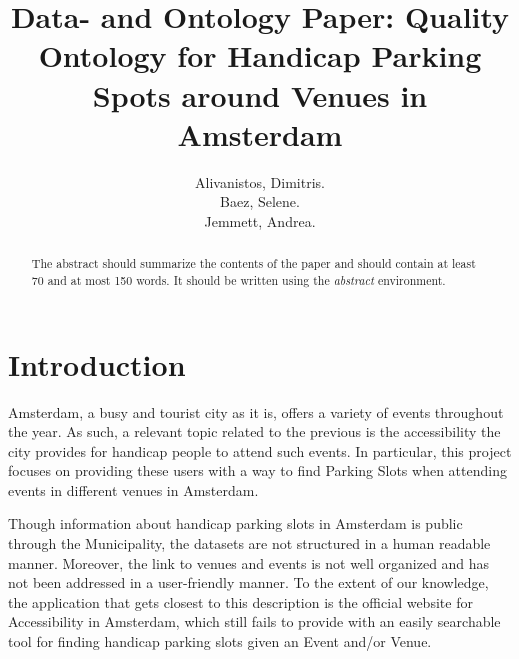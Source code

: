 \documentclass[runningheads,a4paper]{../../StyleFiles/llncs}
\begin{document}
\mainmatter  %

\title{Data- and Ontology Paper: Quality Ontology for Handicap Parking Spots around Venues in Amsterdam}


%
%
\author{Alivanistos, Dimitris. \\ Baez, Selene. \\ Jemmett, Andrea. }
%


\maketitle


\begin{abstract}
The abstract should summarize the contents of the paper and should
contain at least 70 and at most 150 words. It should be written using the
\emph{abstract} environment.
\end{abstract}


\section{Introduction}
Amsterdam, a busy and tourist city as it is, offers a variety of events throughout the year. As such, a relevant topic related to the previous is the accessibility the city provides for handicap people to attend such events. In particular, this project focuses on providing these users with a way to find Parking Slots when attending events in different venues in Amsterdam.

Though information about handicap parking slots in Amsterdam is public through the Municipality, the datasets are not structured in a human readable manner. Moreover, the link to venues and events is not well organized and has not been addressed in a user-friendly manner. To the extent of our knowledge, the application that gets closest to this description is the official website for Accessibility in Amsterdam, which still fails to provide with an easily searchable tool for finding handicap parking slots given an Event and/or Venue.
\end{document}
